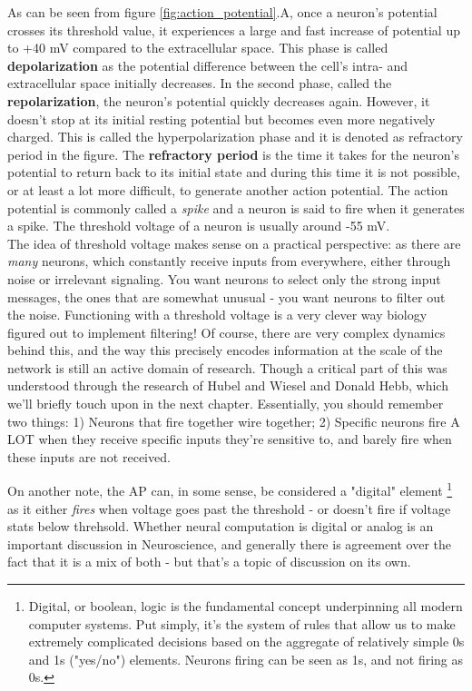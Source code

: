 As can be seen from figure \ref{fig:action_potential}.A, once a neuron's potential crosses its threshold value, it experiences a large and fast increase of potential up to +40 mV compared to the extracellular space. This phase is called \textbf{depolarization} as the potential difference between the cell's intra- and extracellular space initially decreases. In the second phase, called the \textbf{repolarization}, the neuron's potential quickly decreases again. However, it doesn't stop at its initial resting potential but becomes even more negatively charged. This is called the hyperpolarization phase and it is denoted as refractory period in the figure. The \textbf{refractory period} is the time it takes for the neuron's potential to return back to its initial state and during this time it is not possible, or at least a lot more difficult, to generate another action potential. The action potential is commonly called a \textit{spike} and a neuron is said to fire when it generates a spike. The threshold voltage of a neuron is usually around -55 mV.\\

The idea of threshold voltage makes sense on a practical perspective: as there are \textit{many} neurons, which constantly receive inputs from everywhere, either through noise or irrelevant signaling. You want neurons to select only the strong input messages, the ones that are somewhat unusual - you want neurons to filter out the noise. Functioning with a threshold voltage is a very clever way biology figured out to implement filtering! Of course, there are very complex dynamics behind this, and the way this precisely encodes information at the scale of the network is still an active domain of research. Though a critical part of this was understood through the research of Hubel and Wiesel and Donald  Hebb, which we'll briefly touch upon in the next chapter. Essentially, you should remember two things: 1) Neurons that fire together wire together; 2) Specific neurons fire A LOT when they receive specific inputs they're sensitive to, and barely fire when these inputs are not received.

On another note, the AP can, in some sense, be considered a "digital" element \footnote{Digital, or boolean, logic is the fundamental concept underpinning all modern computer systems. Put simply, it's the system of rules that allow us to make extremely complicated decisions based on the aggregate of relatively simple 0s and 1s ("yes/no") elements. Neurons firing can be seen as 1s, and not firing as 0s.} as it either \textit{fires} when voltage goes past the threshold - or doesn't fire if voltage stats below threhsold. Whether neural computation is digital or analog is an important discussion in Neuroscience, and generally there is agreement over the fact that it is a mix of both - but that's a topic of discussion on its own. 

